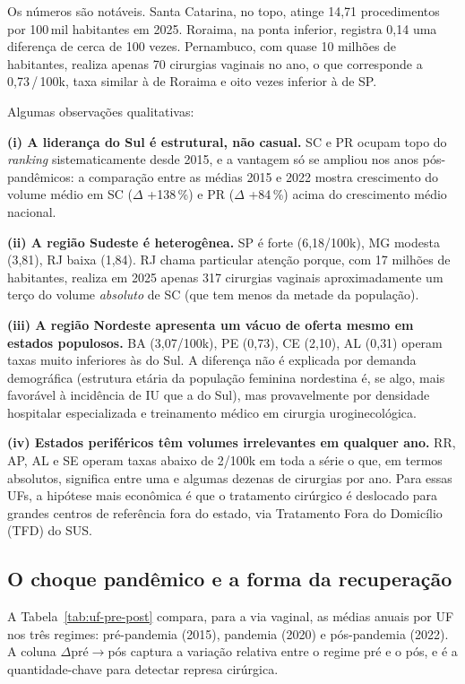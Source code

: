 \documentclass[12pt,a4paper,oneside]{article}
\begin{document}
Os números são notáveis. Santa Catarina, no topo, atinge 14{,}71
procedimentos por 100\,mil habitantes em 2025. Roraima, na ponta
inferior, registra 0{,}14 \textemdash{} uma diferença de cerca
de 100 vezes. Pernambuco, com quase 10 milhões de habitantes,
realiza apenas 70 cirurgias vaginais no ano, o que corresponde a
0{,}73\,/\,100k, taxa similar à de Roraima e oito vezes inferior
à de SP.

Algumas observações qualitativas:

\textbf{(i) A liderança do Sul é estrutural, não casual.} SC e
PR ocupam topo do \textit{ranking} sistematicamente desde 2015,
e a vantagem só se ampliou nos anos pós-pandêmicos: a comparação
entre as médias 2015 e 2022
mostra crescimento do volume médio em SC ($\Delta$ +138\,\%)
e PR ($\Delta$ +84\,\%) acima do crescimento médio nacional.

\textbf{(ii) A região Sudeste é heterogênea.} SP é forte
(6{,}18/100k), MG modesta (3{,}81), RJ baixa (1{,}84). RJ chama
particular atenção porque, com 17 milhões de habitantes, realiza
em 2025 apenas 317 cirurgias vaginais \textemdash{} aproximadamente
um terço do volume \textit{absoluto} de SC (que tem menos da
metade da população).

\textbf{(iii) A região Nordeste apresenta um vácuo de oferta
mesmo em estados populosos.} BA (3{,}07/100k), PE (0{,}73),
CE (2{,}10), AL (0{,}31) operam taxas muito inferiores às
do Sul. A diferença não é explicada por demanda demográfica
(estrutura etária da população feminina nordestina é, se
algo, mais favorável à incidência de IU que a do Sul), mas
provavelmente por densidade hospitalar especializada e
treinamento médico em cirurgia uroginecológica.

\textbf{(iv) Estados periféricos têm volumes irrelevantes em
qualquer ano.} RR, AP, AL e SE operam taxas abaixo de 2/100k
em toda a série \textemdash{} o que, em termos absolutos,
significa entre uma e algumas dezenas de cirurgias por ano.
Para essas UFs, a hipótese mais econômica é que o tratamento
cirúrgico é deslocado para grandes centros de referência fora
do estado, via Tratamento Fora do Domicílio (TFD) do SUS.

\subsection{O choque pandêmico e a forma da recuperação}\label{sub:covid}

A Tabela~\ref{tab:uf-pre-post} compara, para a via vaginal, as
médias anuais por UF nos três regimes: pré-pandemia
(2015), pandemia (2020) e
pós-pandemia (2022). A coluna $\Delta$pré$\rightarrow$pós
captura a variação relativa entre o regime pré e o pós, e é a
quantidade-chave para detectar represa cirúrgica.
\end{document}
